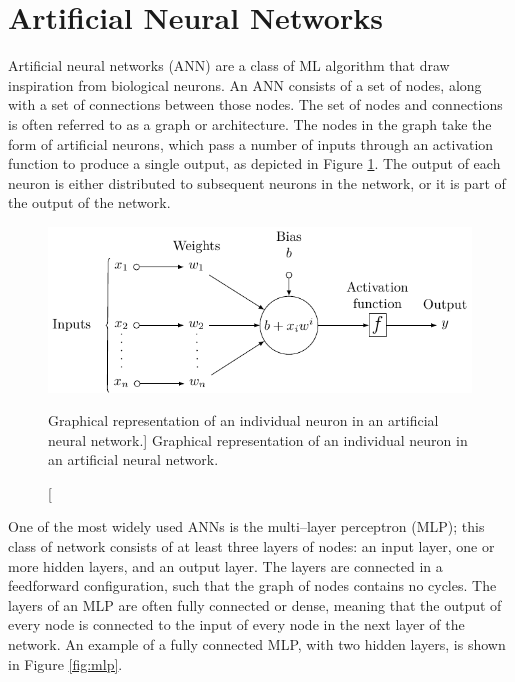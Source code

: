\section{Artificial Neural Networks}
Artificial neural networks (ANN) are a class of ML algorithm that draw
inspiration from biological neurons. An ANN consists of a set of nodes, along
with a set of connections between those nodes. The set of nodes and connections
is often referred to as a graph or architecture. The nodes in 
the graph take the form of artificial neurons, which pass a number of inputs 
through an activation function to produce a single output, as depicted in 
Figure \ref{fig:neuron}.  The output of each neuron is either distributed to 
subsequent neurons in the network, or it is part of the output of the network. 
\begin{figure}

	\centering

	\includegraphics[width = \textwidth]{figures/neuron.pdf}

	\caption
	[Graphical representation of an individual neuron in an artificial neural
	network.]
	{Graphical representation of an individual neuron in an artificial neural
	network.}

	\label{fig:neuron}

\end{figure}

One of the most widely used ANNs is the multi--layer perceptron 
(MLP)\cite{Reed1999}; this class of network consists of at least three layers 
of nodes: an input layer, one or more hidden layers, and an output layer. The 
layers are connected in a feedforward configuration, such that the graph of 
nodes contains no cycles. The layers of an MLP are often fully connected or 
dense, meaning that the output of every node is connected to the input of 
every node in the next layer of the network. An example of a fully connected 
MLP, with two hidden layers, is shown in Figure \ref{fig:mlp}. 

